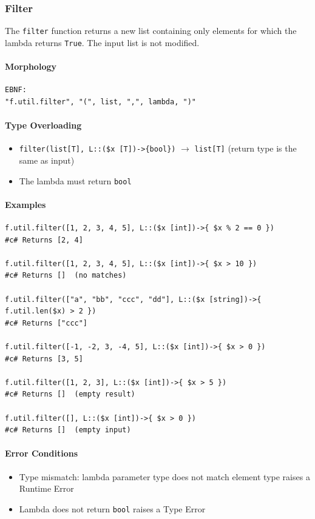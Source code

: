 \subsubsection{Filter}
The \texttt{filter} function returns a new list containing only elements for which the lambda returns \texttt{True}. The input list is not modified.

\paragraph{Morphology}
\begin{verbatim}
EBNF:
"f.util.filter", "(", list, ",", lambda, ")"
\end{verbatim}

\paragraph{Type Overloading}
\begin{itemize}
\item \texttt{filter(list[T], L::(\$x [T])->\{bool\})} $\rightarrow$ \texttt{list[T]}
  (return type is the same as input)
\item The lambda must return \texttt{bool}
\end{itemize}

\paragraph{Examples}
\begin{verbatim}
f.util.filter([1, 2, 3, 4, 5], L::($x [int])->{ $x % 2 == 0 })
#c# Returns [2, 4]

f.util.filter([1, 2, 3, 4, 5], L::($x [int])->{ $x > 10 })
#c# Returns []  (no matches)

f.util.filter(["a", "bb", "ccc", "dd"], L::($x [string])->{ f.util.len($x) > 2 })
#c# Returns ["ccc"]

f.util.filter([-1, -2, 3, -4, 5], L::($x [int])->{ $x > 0 })
#c# Returns [3, 5]

f.util.filter([1, 2, 3], L::($x [int])->{ $x > 5 })
#c# Returns []  (empty result)

f.util.filter([], L::($x [int])->{ $x > 0 })
#c# Returns []  (empty input)
\end{verbatim}

\paragraph{Error Conditions}
\begin{itemize}
\item Type mismatch: lambda parameter type does not match element type raises a Runtime Error
\item Lambda does not return \texttt{bool} raises a Type Error
\end{itemize}

